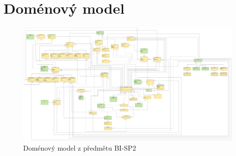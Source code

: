\chapter{Doménový model}\label{dodatek:DomainModel}
    \begin{figure}\centering
	    \includegraphics[angle=90, width=1.0\textwidth]{pdfs/Domain-Model}
	    \caption[Doménový model]{Doménový model z předmětu BI-SP2}\label{image:DomainModel}
    \end{figure}

